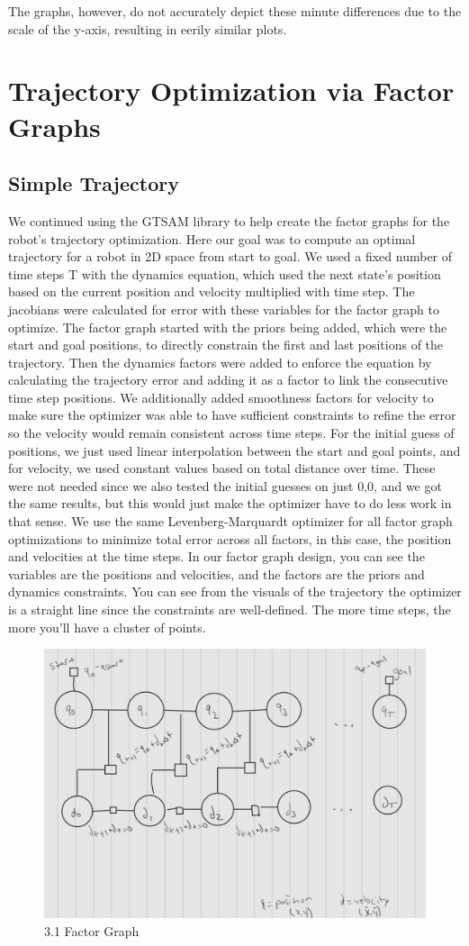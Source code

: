 \documentclass{article}
\begin{document}
The graphs, however, do not accurately depict these minute differences due to the scale of the y-axis, resulting in eerily similar plots.

\section{Trajectory Optimization via Factor Graphs}


\subsection{Simple Trajectory}
We continued using the GTSAM library to help create the factor graphs for the robot's trajectory optimization. Here our goal was to compute an optimal trajectory for a robot in 2D space from start to goal. We used a fixed number of time steps T with the dynamics equation, which used the next state's position based on the current position and velocity multiplied with time step. The jacobians were calculated for error with these variables for the factor graph to optimize. The factor graph started with the priors being added, which were the start and goal positions, to directly constrain the first and last positions of the trajectory. Then the dynamics factors were added to enforce the equation by calculating the trajectory error and adding it as a factor to link the consecutive time step positions. We additionally added smoothness factors for velocity to make sure the optimizer was able to have sufficient constraints to refine the error so the velocity would remain consistent across time steps. For the initial guess of positions, we just used linear interpolation between the start and goal points, and for velocity, we used constant values based on total distance over time. These were not needed since we also tested the initial guesses on just 0,0, and we got the same results, but this would just make the optimizer have to do less work in that sense. We use the same Levenberg-Marquardt optimizer for all factor graph optimizations to minimize total error across all factors, in this case, the position and velocities at the time steps. In our factor graph design, you can see the variables are the positions and velocities, and the factors are the priors and dynamics constraints. You can see from the visuals of the trajectory the optimizer is a straight line since the constraints are well-defined. The more time steps, the more you'll have a cluster of points.

\begin{figure} [H]
    \centering
    \includegraphics[width=0.5\linewidth]{latex_media/fg_traj_opt_factorGraph.jpg}
    \caption{3.1 Factor Graph}
    \label{fig:enter-label}
\end{figure}
\end{document}
